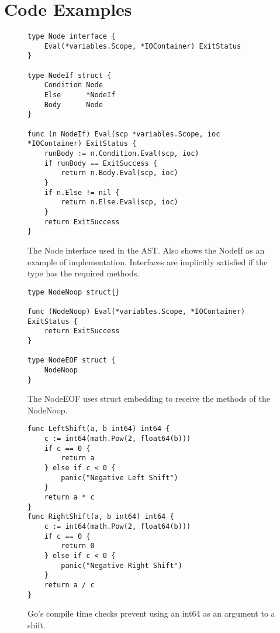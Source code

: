 \chapter{Code Examples}

\begin{figure}[h]
\begin{lstlisting}[frame=tb]
type Node interface {
	Eval(*variables.Scope, *IOContainer) ExitStatus
}

type NodeIf struct {
	Condition Node
	Else      *NodeIf
	Body      Node
}

func (n NodeIf) Eval(scp *variables.Scope, ioc *IOContainer) ExitStatus {
	runBody := n.Condition.Eval(scp, ioc)
	if runBody == ExitSuccess {
		return n.Body.Eval(scp, ioc)
	}
	if n.Else != nil {
		return n.Else.Eval(scp, ioc)
	}
	return ExitSuccess
}     
\end{lstlisting}
\caption[The Node Interface]{The Node interface used in the AST. Also shows the NodeIf as an example of implementation. Interfaces are implicitly satisfied if the type has the required methods. \label{lst:node-interface}}
\end{figure}

\begin{figure}[h]
\begin{lstlisting}[frame=tb]
type NodeNoop struct{}

func (NodeNoop) Eval(*variables.Scope, *IOContainer) ExitStatus {
	return ExitSuccess 
}

type NodeEOF struct {
	NodeNoop
}
\end{lstlisting}
\caption[The EOF and No Op node]{The NodeEOF uses struct embedding to receive the methods of the NodeNoop.\label{lst:node-noop}}
\end{figure}


\begin{figure}[h]
\begin{lstlisting}[frame=tb]
func LeftShift(a, b int64) int64 {
	c := int64(math.Pow(2, float64(b)))
	if c == 0 {
		return a
	} else if c < 0 {
		panic("Negative Left Shift")
	}
	return a * c
}
func RightShift(a, b int64) int64 {
	c := int64(math.Pow(2, float64(b)))
	if c == 0 {
		return 0
	} else if c < 0 {
		panic("Negative Right Shift")
	}
	return a / c
}
\end{lstlisting}
\caption[Shift helper functions]{Go's compile time checks prevent using an int64 as an argument to a shift.\label{lst:arith-shift}}
\end{figure}

